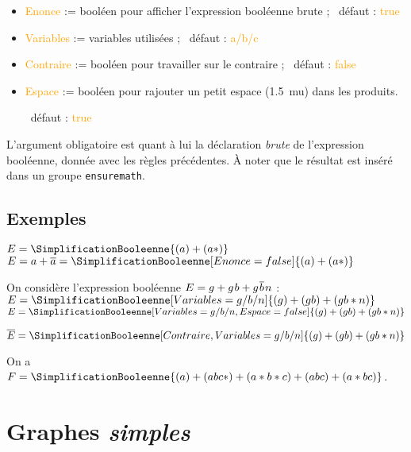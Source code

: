 \documentclass[french,a4paper,11pt]{article}
\newcommand\Cle[1]{{\small\sffamily\textlangle \textcolor{orange}{#1}\textrangle}}
\begin{document}
{{\begin{tipblock}
\begin{itemize}
	\item \Cle{Enonce} := booléen pour afficher l'expression booléenne brute ;  \hfill~défaut : \Cle{true}
	\item \Cle{Variables} := variables utilisées ; \hfill~défaut : \Cle{a/b/c}
	\item \Cle{Contraire} := booléen pour travailler sur le contraire ; \hfill~défaut : \Cle{false}
	\item \Cle{Espace} := booléen pour rajouter un petit espace (1.5~mu) dans les produits.
	
	\hfill~défaut : \Cle{true}
\end{itemize}

L'argument obligatoire est quant à lui la déclaration \textit{brute} de l'expression booléenne, donnée avec les règles précédentes. À noter que le résultat est inséré dans un groupe \texttt{ensuremath}.
\end{tipblock}

\subsection{Exemples}

\begin{DemoCode}
$E = \SimplificationBooleenne{(a)+(a*)}$\\
$E = a + \overline{a} = \SimplificationBooleenne[Enonce=false]{(a)+(a*)}$
\end{DemoCode}

\begin{DemoCode}
On considère l'expression booléenne $E= g + g\mkern1.5mu\relax b + g\mkern1.5mu\relax\overline{b}\mkern1.5mu\relax n$ :\\
$E = \SimplificationBooleenne[Variables=g/b/n]{(g)+(gb)+(gb*n)}$\\
$E = \SimplificationBooleenne[Variables=g/b/n,Espace=false]{(g)+(gb)+(gb*n)}$
\end{DemoCode}

\begin{DemoCode}
$\overline{E} = \SimplificationBooleenne[Contraire,Variables=g/b/n]{(g)+(gb)+(gb*n)}$
\end{DemoCode}

\begin{DemoCode}
On a $F = \SimplificationBooleenne{(a)+(abc*)+(a*b*c)+(abc)+(a*bc)}$.
\end{DemoCode}

\pagebreak

\section{Graphes \textit{simples}}

}}
\end{document}
